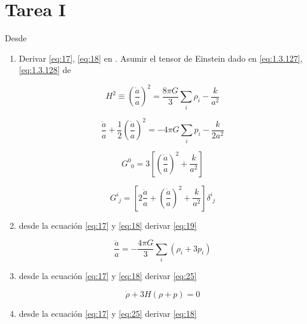 \documentclass[a4paper]{article}
\begin{document}
\section{Tarea I}

Desde \cite{TroddenCarroll2008}

\begin{enumerate}
	\item Derivar \eqref{eq:17}, \eqref{eq:18} en \cite{TroddenCarroll2008}. Asumir el tensor de Einstein dado en \eqref{eq:1.3.127}, \eqref{eq:1.3.128} de \cite{BaumannTripos}
	
\begin{equation}
H^2 \equiv \left( \frac{\dot{a}}{a} \right)^2 = \frac{8\pi G}{3} \sum_i \rho_i - \frac{k}{a^2} 
\tag{17}
\label{eq:17}
\end{equation}

\begin{equation}
\frac{\ddot{a}}{a} + \frac{1}{2} \left( \frac{\dot{a}}{a} \right)^2 = -4\pi G \sum_i p_i - \frac{k}{2a^2}
\tag{18}
\label{eq:18}
\end{equation}

\begin{equation}
G^0_{\phantom{0}0} = 3 \left[ \left( \frac{\dot{a}}{a} \right)^2 + \frac{k}{a^2} \right]
\tag{1.3.127}
\label{eq:1.3.127}
\end{equation}

\begin{equation}
G^i_{\phantom{i}j} = \left[ 2 \frac{\ddot{a}}{a} + \left( \frac{\dot{a}}{a} \right)^2 + \frac{k}{a^2} \right] \delta^i_{\phantom{i}j}
\tag{1.3.128}
\label{eq:1.3.128}
\end{equation}

	\item desde la ecuación \eqref{eq:17} y \eqref{eq:18} derivar \eqref{eq:19}
	
\begin{equation}
\frac{\ddot{a}}{a} = -\frac{4\pi G}{3} \sum_i (\rho_i + 3p_i)
\tag{19}
\label{eq:19}
\end{equation}
	
	\item desde la ecuación \eqref{eq:17} y \eqref{eq:18} derivar \eqref{eq:25}

\begin{equation}
\dot{\rho} + 3H(\rho + p) = 0
\tag{25}
\label{eq:25}
\end{equation}


	\item desde la ecuación \eqref{eq:17} y \eqref{eq:25} derivar \eqref{eq:18}
\end{enumerate}
\end{document}
